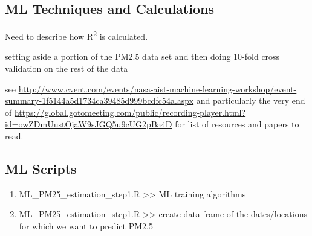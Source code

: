 
\subsection{ML Techniques and Calculations}

Need to describe how R\textsuperscript{2} is calculated.

setting aside a portion of the PM2.5 data set and then doing 10-fold cross validation on the rest of the data

see \url{http://www.cvent.com/events/nasa-aist-machine-learning-workshop/event-summary-1f5144a5d1734ca39485d999bcdfc54a.aspx} and particularly the very end of \url{https://global.gotomeeting.com/public/recording-player.html?id=owZDmUustOjaW9sJGQ5u9cUG2pBa4D} for list of resources and papers to read.


\subsection{ML Scripts}

\begin{enumerate}



\item ML\_PM25\_estimation\_step1.R >> ML training algorithms

\item ML\_PM25\_estimation\_step1.R >> create data frame of the dates/locations for which we want to predict PM2.5

\end{enumerate}